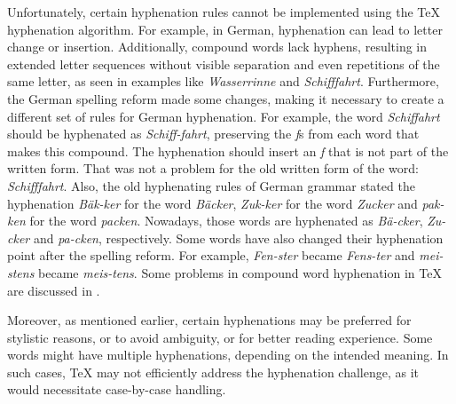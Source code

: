 Unfortunately, certain hyphenation rules cannot be implemented using the \TeX{}
hyphenation algorithm. For example, in German, hyphenation can lead to letter
change or insertion.  Additionally, compound words lack hyphens, resulting in
extended letter sequences without visible separation and even repetitions of
the same letter, as seen in examples like \emph{Wasserrinne} and
\emph{Schifffahrt}.  Furthermore, the German spelling reform made some changes,
making it necessary to create a different set of rules for German hyphenation.
For example, the word \emph{Schiffahrt} should be hyphenated as
\emph{Schiff-fahrt}, preserving the \emph{f}s from each word that makes this
compound. The hyphenation should insert an \emph{f} that is not part of the
written form. That was not a problem for the old written form of the word:
\emph{Schifffahrt}. Also, the old hyphenating rules of German grammar stated
the hyphenation \emph{Bäk-ker} for the word \emph{Bäcker}, \emph{Zuk-ker} for
the word \emph{Zucker} and \emph{pak-ken} for the word \emph{packen}. Nowadays, those
words are hyphenated as \emph{Bä-cker}, \emph{Zu-cker} and \emph{pa-cken},
respectively. Some words have also changed their hyphenation point after the
spelling reform. For example, \emph{Fen-ster} became \emph{Fens-ter} and
\emph{mei-stens} became \emph{meis-tens}. Some problems in compound word
hyphenation in \TeX{} are discussed in \textcite{sojka1995a}.










Moreover, as mentioned earlier, certain hyphenations may be preferred for
stylistic reasons, or to avoid ambiguity, or for better reading experience.
Some words might have multiple hyphenations, depending on the intended meaning.
In such cases, \TeX{} may not efficiently address the hyphenation challenge, as
it would necessitate case-by-case handling.


